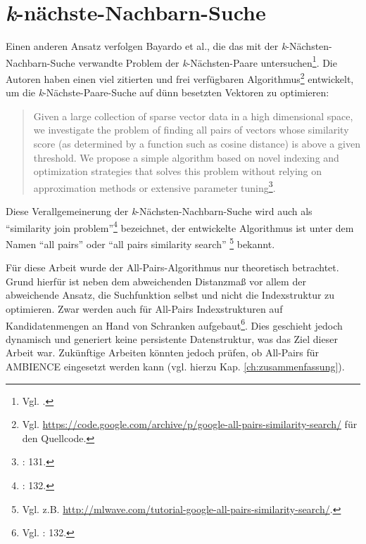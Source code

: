 \section{\textit{k}-nächste-Nachbarn-Suche}\label{sec:bloom-knn}
Einen anderen Ansatz verfolgen Bayardo et al., die das mit der \textit{k}-Nächsten-Nachbarn-Suche verwandte Problem der \textit{k}-Nächsten-Paare untersuchen\footnote{Vgl. \cite{Bayardo2007}.}. Die Autoren haben einen viel zitierten und frei verfügbaren Algorithmus\footnote{Vgl. \url{https://code.google.com/archive/p/google-all-pairs-similarity-search/} für den Quellcode.} entwickelt, um die \textit{k}-Nächste-Paare-Suche auf dünn besetzten Vektoren zu optimieren: 
\begin{quote}
Given a large collection of sparse vector data in a high dimensional space, we investigate the problem of finding all pairs of vectors whose similarity score (as determined by a function such as cosine distance) is above a given threshold. We propose a simple algorithm based on novel indexing and optimization strategies that solves this problem without relying on approximation methods or extensive parameter tuning\footnote{\cite{Bayardo2007}: 131.}. 
\end{quote}
Diese Verallgemeinerung der \textit{k}-Nächsten-Nachbarn-Suche wird auch als "`similarity join problem"'\footnote{\cite{Bayardo2007}: 132.} bezeichnet, der entwickelte Algorithmus ist unter dem Namen "`all pairs"' oder "`all pairs similarity search"' \footnote{Vgl. z.B. \url{http://mlwave.com/tutorial-google-all-pairs-similarity-search/}.} bekannt. 

Für diese Arbeit wurde der All-Pairs-Algorithmus nur theoretisch betrachtet. Grund hierfür ist neben dem abweichenden Distanzmaß vor allem der abweichende Ansatz, die Suchfunktion selbst und nicht die Indexstruktur zu optimieren. Zwar werden auch für All-Pairs Indexstrukturen auf Kandidatenmengen an Hand von Schranken aufgebaut\footnote{Vgl. \cite{Bayardo2007}: 132.}. Dies geschieht jedoch dynamisch und generiert keine persistente Datenstruktur, was das Ziel dieser Arbeit war. Zukünftige Arbeiten könnten jedoch prüfen, ob All-Pairs für AMBIENCE eingesetzt werden kann (vgl. hierzu Kap. \ref{ch:zusammenfassung}). 